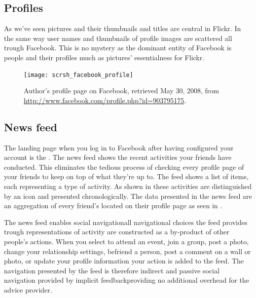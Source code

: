 \subsection{Profiles}

As we've seen pictures and their thumbnails and titles are central in Flickr.
In the same way user names and thumbnails of profile images are scattered all
trough Facebook. This is no mystery as the dominant entity of Facebook is
people and their profiles much as pictures' essentialness for Flickr.

\begin{figure}
  \begin{whole}
    \texttt{[image: scrsh\_facebook\_profile]}
    \caption[Facebook Profile]{%
       Author's profile page on Facebook,
       retrieved May 30, 2008, from
       \url{http://www.facebook.com/profile.php?id=903795175}.}
    \label{figure:scrsh.facebook.profile}
  \end{whole}
\end{figure}

\subsection{News feed}
\label{section:analysis.facebook.news.feed}

The landing page when you log in to Facebook after having configured your
account is the  .
The news feed shows the recent activities your
friends have conducted. This eliminates the tedious process of checking every
profile page of your friends to keep on top of what they're up to.
The feed shows a list of items, each representing a type of activity. As
shown in 
these activities are distinguished by an
icon and presented chronologically. The data presented in the news feed are an
aggregation of every friend's  located on their profile page
 as seen in .

The news feed enables social navigation\dash{}all
navigational choices the feed provides
trough representations of activity are constructed as a by-product of
other people's actions. When you select to attend an event, join a group,
post a photo, change your relationship settings, befriend a person, post a
comment on a wall or photo, or update your profile information your action
is added to the feed. The navigation presented by the feed
is therefore indirect and passive social navigation provided by implicit
feedback\dash{}providing no additional overhead for the advice provider.

